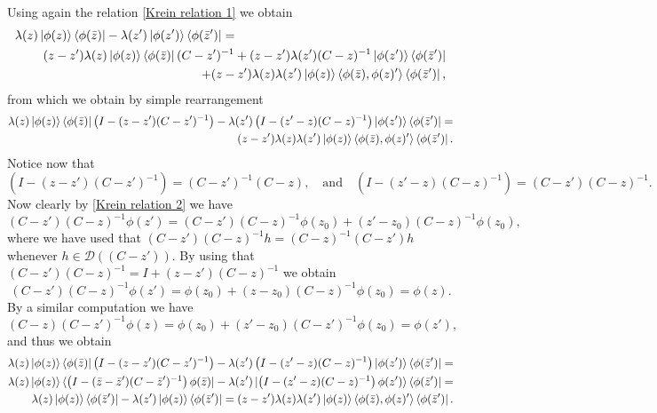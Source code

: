 \documentclass[a4paper,11pt]{article}
\newcommand{\dom}[1]{\mathscr D\left(#1\right)}
\numberwithin{equation}{section}
\begin{document}
Using again the relation \eqref{Krein relation 1} we obtain\begin{equation}
\begin{aligned}
\lambda(z)\ket{\phi(z)}\bra{\phi(\bar{z})}-\lambda(z')\ket{\phi(z')}\bra{\phi(\bar{z}')}=\qquad\qquad\qquad\qquad\qquad\quad\qquad\qquad\qquad\\(z-z')\lambda(z)\ket{\phi(z)}\bra{\phi(\bar{z})}(C-z')^{-1}+(z-z')\lambda(z')(C-z)^{-1}\ket{\phi(z')}\bra{\phi(\bar{z}')}\\+(z-z')\lambda(z)\lambda(z')\ket{\phi(z)}\braket{\phi(\bar{z}),\phi(z)'}\bra{\phi(\bar{z}')},
\end{aligned}
\end{equation}
from which we obtain by simple rearrangement \begin{equation}
\begin{aligned}
\lambda(z)\ket{\phi(z)}\bra{\phi(\bar{z})}\left(I-(z-z')(C-z')^{-1}\right)-\lambda(z')\left(I-(z'-z)(C-z)^{-1}\right)\ket{\phi(z')}\bra{\phi(\bar{z}')}=\\(z-z')\lambda(z)\lambda(z')\ket{\phi(z)}\braket{\phi(\bar{z}),\phi(z)'}\bra{\phi(\bar{z}')}.
\end{aligned}
\end{equation}
Notice now that \begin{equation}
\left(I-(z-z')(C-z')^{-1}\right)=(C-z')^{-1}(C-z),\quad\text{and}\quad \left(I-(z'-z)(C-z)^{-1}\right)=(C-z')(C-z)^{-1}.
\end{equation}
Now clearly by \eqref{Krein relation 2} we have \begin{equation}
(C-z')(C-z)^{-1}\phi(z')=(C-z')(C-z)^{-1}\phi(z_0)+(z'-z_0)(C-z)^{-1}\phi(z_0),
\end{equation}
where we have used that $ (C-z')(C-z)^{-1}h=(C-z)^{-1}(C-z')h $ whenever $ h\in\dom{(C-z')} $. By using that  $ (C-z')(C-z)^{-1}=I+(z-z')(C-z)^{-1} $ we obtain\begin{equation}
(C-z')(C-z)^{-1}\phi(z')=\phi(z_0)+(z-z_0)(C-z)^{-1}\phi(z_0)=\phi(z).
\end{equation}
By a similar computation we have \begin{equation}
(C-z)(C-z')^{-1}\phi(z)=\phi(z_0)+(z'-z_0)(C-z')^{-1}\phi(z_0)=\phi(z'),
\end{equation}
and thus we obtain\begin{equation}
\begin{aligned}
\lambda(z)\ket{\phi(z)}\bra{\phi(\bar{z})}\left(I-(z-z')(C-z')^{-1}\right)-\lambda(z')\left(I-(z'-z)(C-z)^{-1}\right)\ket{\phi(z')}\bra{\phi(\bar{z}')}=\\
\lambda(z)\ket{\phi(z)}\bra{\left(I-(\bar{z}-\bar{z}')(C-\bar{z}')^{-1}\right)\phi(\bar{z})}-\lambda(z')\ket{\left(I-(z'-z)(C-z)^{-1}\right)\phi(z')}\bra{\phi(\bar{z}')}=\\
\lambda(z)\ket{\phi(z)}\bra{\phi(\bar{z}')}-\lambda(z')\ket{\phi(z)}\bra{\phi(\bar{z}')}=(z-z')\lambda(z)\lambda(z')\ket{\phi(z)}\braket{\phi(\bar{z}),\phi(z)'}\bra{\phi(\bar{z}')}.
\end{aligned}
\end{equation}
\end{document}
